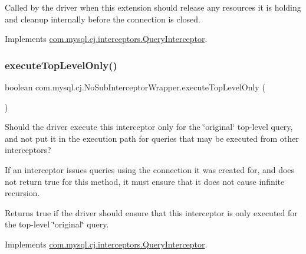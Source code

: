 Called by the driver when this extension should release any resources it is holding and cleanup internally before the connection is closed. 

Implements \mbox{\hyperlink{interfacecom_1_1mysql_1_1cj_1_1interceptors_1_1_query_interceptor_a123809a91800f4f4409f5f37717bf9c8}{com.\+mysql.\+cj.\+interceptors.\+Query\+Interceptor}}.

\mbox{\label{classcom_1_1mysql_1_1cj_1_1_no_sub_interceptor_wrapper_a84d3030e0055b60ed0bb2b56fd5a0dbe}} 
\subsubsection{\texorpdfstring{execute\+Top\+Level\+Only()}{executeTopLevelOnly()}}
{\footnotesize\ttfamily boolean com.\+mysql.\+cj.\+No\+Sub\+Interceptor\+Wrapper.\+execute\+Top\+Level\+Only (\begin{DoxyParamCaption}{ }\end{DoxyParamCaption})}

Should the driver execute this interceptor only for the \char`\"{}original\char`\"{} top-\/level query, and not put it in the execution path for queries that may be executed from other interceptors?

If an interceptor issues queries using the connection it was created for, and does not return {\ttfamily true} for this method, it must ensure that it does not cause infinite recursion.

\begin{DoxyReturn}{Returns}
true if the driver should ensure that this interceptor is only executed for the top-\/level \char`\"{}original\char`\"{} query. 
\end{DoxyReturn}


Implements \mbox{\hyperlink{interfacecom_1_1mysql_1_1cj_1_1interceptors_1_1_query_interceptor_ab12edf90713df907ba400dbe3ba03ea6}{com.\+mysql.\+cj.\+interceptors.\+Query\+Interceptor}}.

\mbox{\label{classcom_1_1mysql_1_1cj_1_1_no_sub_interceptor_wrapper_ab3778df7a64125bbc4121fa747c6b5a4}} 
